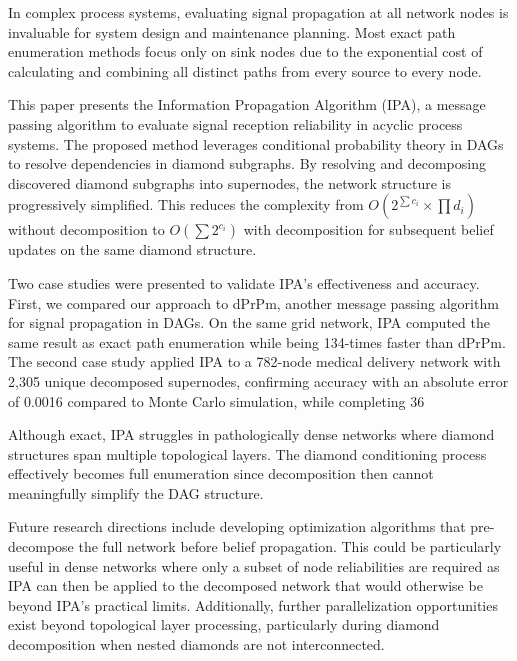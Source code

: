 In complex process systems, evaluating signal propagation at all network nodes is invaluable for system design and maintenance planning. Most exact path enumeration methods focus only on sink nodes due to the exponential cost of calculating and combining all distinct paths from every source to every node. 

This paper presents the Information Propagation Algorithm (IPA), a message passing algorithm to evaluate signal reception reliability in acyclic process systems. The proposed method leverages conditional probability theory in DAGs to resolve dependencies in diamond subgraphs. By resolving and decomposing discovered diamond subgraphs into supernodes, the network structure is progressively simplified. This reduces the complexity from $O(2^{\sum c_i} \times \prod d_i)$ without decomposition to $O(\sum 2^{c_i})$ with decomposition for subsequent belief updates on the same diamond structure.

Two case studies were presented to validate IPA's effectiveness and accuracy. First, we compared our approach to dPrPm, another message passing algorithm for signal propagation in DAGs. On the same grid network, IPA computed the same result as exact path enumeration while being 134-times faster than dPrPm. 
The second case study applied IPA to a 782-node medical delivery network with 2,305 unique decomposed supernodes, confirming accuracy with an absolute error of 0.0016 compared to Monte Carlo simulation, while completing 36%

Although exact, IPA struggles in pathologically dense networks where diamond structures span multiple topological layers. The diamond conditioning process effectively becomes full enumeration since decomposition then cannot meaningfully simplify the DAG structure. 

Future research directions include developing optimization algorithms that pre-decompose the full network before belief propagation.  This could be particularly useful in dense networks where only a subset of node reliabilities are required as IPA can then be applied to the decomposed network that would otherwise be beyond IPA’s practical limits. 
Additionally, further parallelization opportunities exist beyond topological layer processing, particularly during diamond decomposition when nested diamonds are not interconnected. 

%


